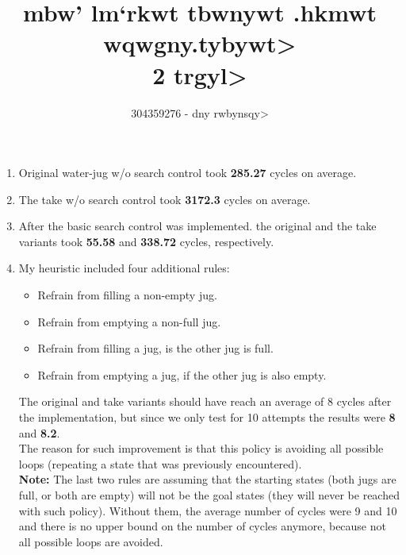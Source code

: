\documentclass{article}
\title{\<mbw' lm`rkwt tbwnywt .hkmwt wqwgny.tybywt>\\2 \<trgyl>}
\author{304359276 - \<dny rwbynsqy>}
\date{}
\begin{document}
\maketitle

\begin{enumerate}
  \item Original water-jug  w/o search control took \textbf{285.27} cycles on average.
  \item The take w/o search control took \textbf{3172.3} cycles on average. 
  \item After the basic search control was implemented. the original and the take variants took \textbf{55.58} and \textbf{338.72} cycles, respectively.
  \item My heuristic included four additional rules:
    \begin{itemize}
      \item Refrain from filling a non-empty jug.
      \item Refrain from emptying a non-full jug.
      \item Refrain from filling a jug, is the other jug is full.
      \item Refrain from emptying a jug, if the other jug is also empty.
    \end{itemize}
    The original and take variants should have reach an average of 8 cycles after the implementation, but since we only test for 10 attempts the results were \textbf{8} and \textbf{8.2}.\\
    The reason for such improvement is that this policy is avoiding all possible loops (repeating a state that was previously encountered).\\
    \textbf{Note:} The last two rules are assuming that the starting states (both jugs are full, or both are empty) will not be the goal states (they will never be reached with such policy). Without them, the average number of cycles were 9 and 10 and there is no upper bound on the number of cycles anymore, because not all possible loops are avoided.
\end{enumerate}
\end{document}
